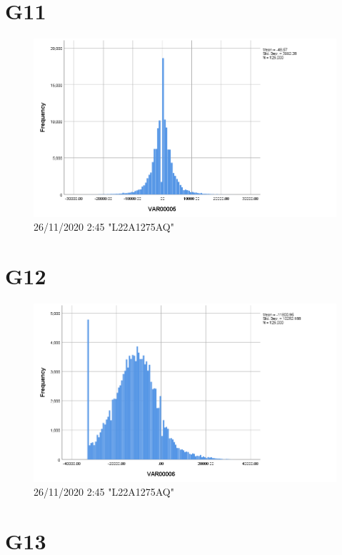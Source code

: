 \documentclass[hidelinks, 12pt, a4paper]{article}
\begin{document}
\section{G11}

\begin{figure}[h!]
\centering
	\includegraphics[height=.38\textheight, width=\textwidth]{assets/session1/g11.png}
    \caption{26/11/2020 2:45 "L22A1275AQ"}
\end{figure}

\section{G12}

\begin{figure}[h!]
	\centering
		\includegraphics[height=.38\textheight, width=\textwidth]{assets/session1/g12.png}
    \caption{26/11/2020 2:45 "L22A1275AQ"}
	\end{figure}

\section{G13}
\end{document}
